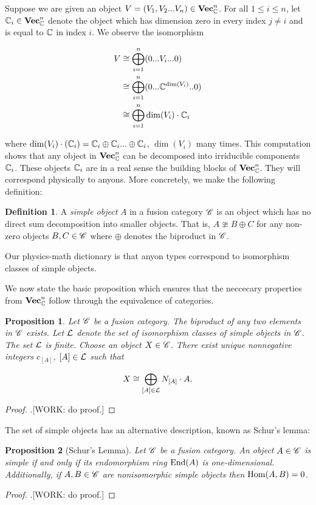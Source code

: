 \documentclass{article}
\newtheorem{proposition}{Proposition}[section]
\theoremstyle{definition}
\newtheorem*{definition}{Definition}
\numberwithin{figure}{section}
\begin{document}
Suppose we are given an object $V=(V_1,V_2...V_n)\in \mathbf{Vec}_{\mathbb{C}}^n$. For all $1\leq i\leq n$, let  $\mathbb{C}_i\in \mathbf{Vec}_{\mathbb{C}}^n$ denote the object which has dimension zero in every index $j\neq i$ and is equal to $\mathbb{C}$ in index $i$. We observe the isomorphism

\begin{align*}
V& \cong \bigoplus_{i=1}^n (0... V_i ... 0)\\
& \cong \bigoplus_{i=1}^n (0... \mathbb{C}^{\dim (V_i)}.. 0)\\
& \cong \bigoplus_{i=1}^n \dim(V_i)\cdot \mathbb{C}_i
\end{align*}

where $\dim(V_i)\cdot (\mathbb{C}_i)=\mathbb{C}_i\oplus \mathbb{C}_i...\oplus \mathbb{C}_i$, $\dim(V_i)$ many times. This computation shows that any object in $\mathbf{Vec}_{\mathbb{C}}^n$ can be decomposed into irriducible components $\mathbb{C}_i$. These objects $\mathbb{C}_i$ are in a real sense the building blocks of $\mathbf{Vec}_{\mathbb{C}}^n$. They will correspond physically to anyons. More concretely, we make the following definition:

\begin{definition} A \textit{simple object} $A$ in a fusion category $\mathscr{C}$ is an object which has no direct sum decomposition into smaller objects. That is, $A\ncong B\oplus C$ for any non-zero objects $B,C\in \mathscr{C}$ where $\oplus$ denotes the biproduct in $\mathscr{C}$.
\end{definition}

Our physics-math dictionary is that anyon types correspond to isomorphism classes of simple objects.

We now state the basic proposition which ensures that the neccecary properties from $\mathbf{Vec}_{\mathbb{C}}^n$ follow through the equivalence of categories.

\begin{proposition} Let $\mathscr{C}$ be a fusion category. The biproduct of any two elements in $\mathscr{C}$ exists. Let $\mathcal{L}$ denote the set of isomorphism classes of simple objects in $\mathscr{C}$. The set $\mathcal{L}$ is finite. Choose an object $X\in \mathscr{C}$. There exist unique nonnegative integers $c_{[A]}$, $[A]\in \mathcal{L}$ such that 

$$X\cong \bigoplus_{[A]\in \mathcal{L}}N_{[A]}\cdot A.$$
\end{proposition}
\begin{proof}.[WORK: do proof.]
\end{proof}

The set of simple objects has an alternative description, known as Schur's lemma:

\begin{proposition}[Schur's Lemma] Let $\mathscr{C}$ be a fusion category. An object $A\in \mathscr{C}$ is simple if and only if its endomorphism ring $\mathrm{End}(A)$ is one-dimensional. Additionally, if $A,B\in \mathscr{C}$ are nonisomorphic simple objects then $\mathrm{Hom}(A,B)=0$.
\end{proposition}
\begin{proof}.[WORK: do proof.]
\end{proof}
\end{document}
